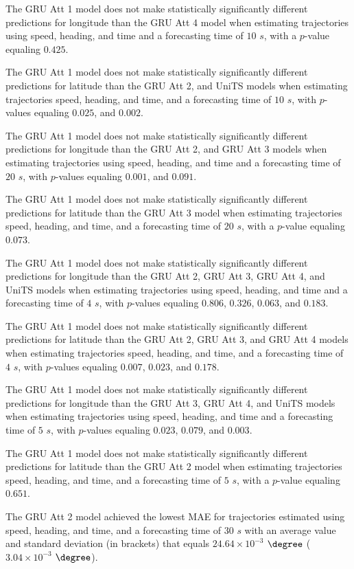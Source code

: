The GRU Att 1 model does not make statistically significantly different predictions for longitude than the GRU Att 4 model when estimating trajectories using speed, heading, and time and a forecasting time of $10$ $s$, with a $p$-value equaling $0.425$.

The GRU Att 1 model does not make statistically significantly different predictions for latitude than the GRU Att 2, and UniTS models when estimating trajectories speed, heading, and time, and a forecasting time of $10$ $s$, with $p$-values equaling $0.025$, and $0.002$.

The GRU Att 1 model does not make statistically significantly different predictions for longitude than the GRU Att 2, and GRU Att 3 models when estimating trajectories using speed, heading, and time and a forecasting time of $20$ $s$, with $p$-values equaling $0.001$, and $0.091$.

The GRU Att 1 model does not make statistically significantly different predictions for latitude than the GRU Att 3 model when estimating trajectories speed, heading, and time, and a forecasting time of $20$ $s$, with a $p$-value equaling $0.073$.

The GRU Att 1 model does not make statistically significantly different predictions for longitude than the GRU Att 2, GRU Att 3, GRU Att 4, and UniTS models when estimating trajectories using speed, heading, and time and a forecasting time of $4$ $s$, with $p$-values equaling $0.806$, $0.326$, $0.063$, and $0.183$.

The GRU Att 1 model does not make statistically significantly different predictions for latitude than the GRU Att 2, GRU Att 3, and GRU Att 4 models when estimating trajectories speed, heading, and time, and a forecasting time of $4$ $s$, with $p$-values equaling $0.007$, $0.023$, and $0.178$.

The GRU Att 1 model does not make statistically significantly different predictions for longitude than the GRU Att 3, GRU Att 4, and UniTS models when estimating trajectories using speed, heading, and time and a forecasting time of $5$ $s$, with $p$-values equaling $0.023$, $0.079$, and $0.003$.

The GRU Att 1 model does not make statistically significantly different predictions for latitude than the GRU Att 2 model when estimating trajectories speed, heading, and time, and a forecasting time of $5$ $s$, with a $p$-value equaling $0.651$.

The GRU Att 2 model achieved the lowest MAE for trajectories estimated using speed, heading, and time, and a forecasting time of $30$ $s$ with an average value and standard deviation (in brackets) that equals $24.64 \times 10^{-3}$ $\degree$ ($3.04 \times 10^{-3}$ $\degree$).


